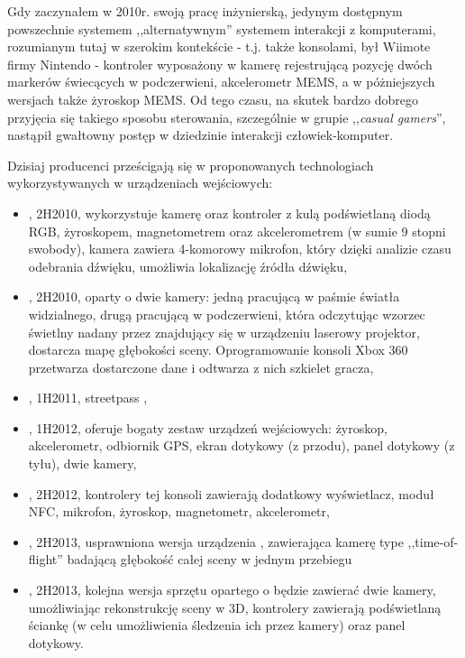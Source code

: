 \label{ch:current_state}

Gdy zaczynałem w 2010r. swoją pracę inżynierską, jedynym dostępnym powszechnie systemem ,,alternatywnym'' systemem interakcji z komputerami, rozumianym tutaj w szerokim kontekście - t.j. także konsolami, był Wiimote firmy Nintendo - kontroler wyposażony w kamerę rejestrującą pozycję dwóch markerów świecących w podczerwieni, akcelerometr MEMS, a w póżniejszych wersjach także żyroskop MEMS. Od tego czasu, na skutek bardzo dobrego przyjęcia się takiego sposobu sterowania, szczególnie w grupie ,,\textit{casual gamers}'', nastąpił gwałtowny postęp w dziedzinie interakcji człowiek-komputer.

Dzisiaj producenci prześcigają się w proponowanych technologiach wykorzystywanych w urządzeniach wejściowych:
\begin{itemize}
 \item {}, 2H2010, wykorzystuje kamerę oraz kontroler z kulą podświetlaną diodą RGB, żyroskopem, magnetometrem oraz akcelerometrem (w sumie 9 stopni swobody), kamera zawiera 4-komorowy mikrofon, który dzięki analizie czasu odebrania dźwięku, umożliwia lokalizację źródła dźwięku,
 \item {}, 2H2010, oparty o dwie kamery: jedną pracującą w paśmie światła widzialnego, drugą pracującą w podczerwieni, która odczytując wzorzec świetlny nadany przez znajdujący się w urządzeniu laserowy projektor, dostarcza mapę głębokości sceny. Oprogramowanie konsoli Xbox 360 przetwarza dostarczone dane i odtwarza z nich szkielet gracza,
 \item {}, 1H2011, streetpass ,
 \item {}, 1H2012, oferuje bogaty zestaw urządzeń wejściowych: żyroskop, akcelerometr, odbiornik GPS, ekran dotykowy (z przodu), panel dotykowy (z tyłu), dwie kamery,
 \item {}, 2H2012, kontrolery tej konsoli zawierają dodatkowy wyświetlacz, moduł NFC, mikrofon, żyroskop, magnetometr, akcelerometr,
 \item {}, 2H2013, usprawniona wersja urządzenia , zawierająca kamerę type ,,time-of-flight'' badającą głębokość całej sceny w jednym przebiegu
 \item {}, 2H2013, kolejna wersja sprzętu opartego o  będzie zawierać dwie kamery, umożliwiając rekonstrukcję sceny w 3D, kontrolery zawierają  podświetlaną ściankę (w celu umożliwienia śledzenia ich przez kamery) oraz panel dotykowy.
\end{itemize}

